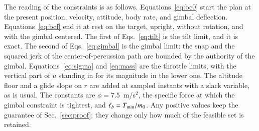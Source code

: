 The reading of the constraints is as follows. Equations~\eqref{eq:bc0} start the plan at the present position, velocity,
attitude, body rate, and gimbal deflection. Equations~\eqref{eq:bcf} end it at rest on the target, upright, without rotation,
and with the gimbal centered. The first of Eqs.~\eqref{eq:tilt} is the tilt limit, and it is exact. The second of
Eqs.~\eqref{eq:gimbal} is the gimbal limit: the snap and the squared jerk of the center-of-percussion path are bounded by the
authority of the gimbal. Equations~\eqref{eq:sigma} and \eqref{eq:mass} are the throttle limits, with the vertical part of $u$
standing in for its magnitude in the lower one. The altitude floor and a glide slope on $r$ are added at sampled instants with
a slack variable, as is usual. The constants are $\phi=7.5$~m/s$^2$, the specific force at which the gimbal constraint is
tightest, and $\ell_b=T_{\min}/m_0$. Any positive values keep the guarantee of Sec.~\ref{sec:proof}; they change only how much of
the feasible set is retained.

